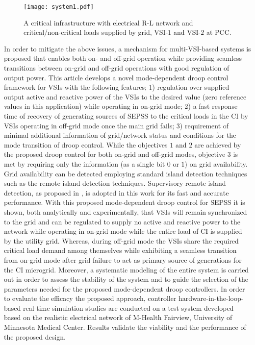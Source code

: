 \documentclass[journal]{IEEEtran}
\begin{document}
\begin{figure}[t]
	\centering
    \texttt{[image: system1.pdf]}%
	\caption{A critical infrastructure with electrical R-L network and critical/non-critical loads supplied by grid, VSI-$1$ and VSI-$2$ at PCC.}
	\label{fig:system1}
\end{figure}
\par In order to mitigate the above issues, a mechanism for multi-VSI-based systems is proposed that enables both on- and off-grid operation while providing seamless transitions between on-grid and off-grid operations with good regulation of output power. This article develops a novel mode-dependent droop control framework for VSIs with the following features; 1) regulation over supplied output active and reactive power of the VSIs to the desired value (zero reference values in this application) while operating in on-grid mode; 2) a fast response time of recovery of generating sources of SEPSS to the critical loads in the CI by VSIs operating in off-grid mode once the main grid fails; 3) requirement of minimal additional information of grid/network status and conditions for the mode transition of droop control. While the objectives $1$ and $2$ are achieved by the proposed droop control for both on-grid and off-grid modes, objective $3$ is met by requiring only the information (as a single bit $0$ or $1$) on grid availability. Grid availability can be detected employing standard island detection techniques such as the remote island detection techniques. Supervisory remote island detection, as proposed in \cite{island}, is adopted in this work for its fast and accurate performance. With this proposed mode-dependent droop control for SEPSS it is shown, both analytically and experimentally, that VSIs will remain synchronized to the grid and can be regulated to supply no active and reactive power to the network while operating in on-grid mode while the entire load of CI is supplied by the utility grid. Whereas, during off-grid mode the VSIs share the required critical load demand among themselves while exhibiting a seamless transition from on-grid mode after grid failure to act as primary source of generations for the CI microgrid. Moreover, a systematic modeling of the entire system is carried out in order to assess the stability of the system and to guide the selection of the parameters needed for the proposed mode-dependent droop controllers. In order to evaluate the efficacy the proposed approach, controller hardware-in-the-loop-based real-time simulation studies are conducted on a test-system developed based on the realistic electrical network of M-Health Fairview, University of Minnesota Medical Center. Results validate the viability and the performance of the proposed design.
\end{document}

